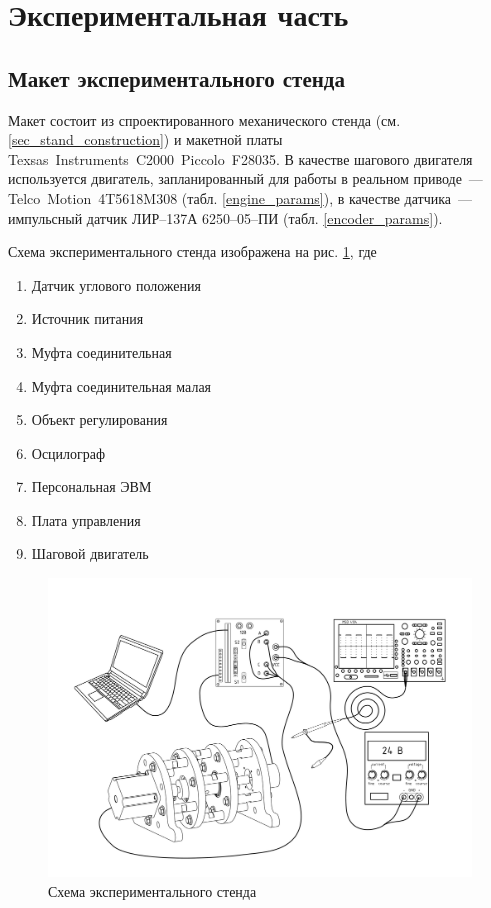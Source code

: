 \newpage
\section{Экспериментальная часть}
\subsection{Макет экспериментального стенда}

Макет состоит из спроектированного механического стенда
(см. \ref{sec_stand_construction}) и макетной платы
Texsas~Instruments~C2000~Piccolo~F28035.
В качестве шагового двигателя используется двигатель, запланированный для работы
в реальном приводе~--- Telco~Motion~4T5618M308 (табл. \ref{engine_params}), в
качестве датчика~--- импульсный датчик ЛИР--137А 6250--05--ПИ
(табл. \ref{encoder_params}).

Схема экспериментального стенда изображена на рис.
\ref{pic_experim_stand_scheme}, где

\begin{enumerate}
       \item Датчик углового положения
       \item Источник питания
       \item Муфта соединительная
       \item Муфта соединительная малая
       \item Объект регулирования
       \item Осцилограф
       \item Персональная ЭВМ
       \item Плата управления
       \item Шаговой двигатель
\end{enumerate}

\begin{figure}[hb]
    \centering
    \centering
    \includegraphics[width=\linewidth, keepaspectratio,
                    clip=true, trim=51mm 21mm 51mm 20mm]
                    {src/pictures/experimental_stand_draft}
    \caption{Схема экспериментального стенда}
    \label{pic_experim_stand_scheme}
\end{figure}
